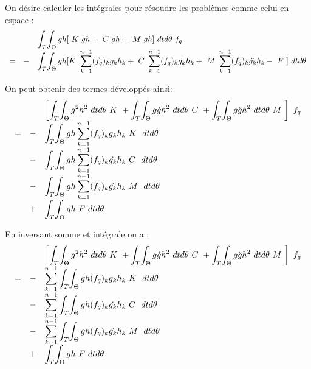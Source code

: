 On désire calculer les intégrales pour résoudre les problèmes comme celui en espace :
\begin{equation}
\begin{array}{r r l}
	&& \displaystyle
		\int_T \! \int_\Theta
			gh [  ~K~ gh
				+ ~C~ \dot{g}h 
				+ ~M~ \ddot{g}h
				] ~dt d\theta 
	~ f_q
	\\
	= &-& \displaystyle
		\int_T \! \int_\Theta		
			gh [  K~ \sum_{k=1}^{n-1} (f_q)_k       g_k  h_k 
				+ ~C~ \sum_{k=1}^{n-1} (f_q)_k  \dot{g_k} h_k 
				+ ~M~ \sum_{k=1}^{n-1} (f_q)_k \ddot{g_k} h_k
				- ~F~] ~dt d\theta
\end{array}
\end{equation}

On peut obtenir des termes développés ainsi:
\begin{equation}
\begin{array}{r r l}

	&&\left[\displaystyle
	\int_T \! \int_\Theta
		g^2h^2 ~dt d\theta ~K~
	+ \int_T \! \int_\Theta
		g \dot{g} h^2 ~dt d\theta ~C~ 
	+ \int_T \! \int_\Theta
		g \ddot{g} h^2 ~dt d\theta ~M~
			\right] ~ f_q
	\\
	= &-&
	 \displaystyle
	 \int_T \! \int_\Theta		
		gh \sum_{k=1}^{n-1} (f_q)_k       g_k  h_k ~K~ ~dt d\theta
	\\
	&-&
	 \displaystyle
	 \int_T \! \int_\Theta
	 	gh \sum_{k=1}^{n-1} (f_q)_k  \dot{g_k} h_k ~C~  ~dt d\theta
	\\
	&-&
	 \displaystyle
	 \int_T \! \int_\Theta
	 	gh \sum_{k=1}^{n-1} (f_q)_k \ddot{g_k} h_k ~M~ ~dt d\theta
	\\
	&+&
	 \displaystyle
	 \int_T \! \int_\Theta
	 	gh ~F ~dt d\theta 
\end{array}
\end{equation}

En inversant somme et intégrale on a :
\begin{equation}
\begin{array}{r r l}

	&&\left[\displaystyle
	\int_T \! \int_\Theta
		g^2h^2 ~dt d\theta ~K~
	+ \int_T \! \int_\Theta
		g \dot{g} h^2 ~dt d\theta ~C~ 
	+ \int_T \! \int_\Theta
		g \ddot{g} h^2 ~dt d\theta ~M~
			\right] ~ f_q
	\\
	= &-&
	 \displaystyle 
	 \sum_{k=1}^{n-1}
		 \int_T \! \int_\Theta		
			gh (f_q)_k       g_k  h_k ~K~ ~dt d\theta
	\\
	&-&
	 \displaystyle
	 \sum_{k=1}^{n-1}
		 \int_T \! \int_\Theta
		 	gh (f_q)_k  \dot{g_k} h_k ~C~  ~dt d\theta
	\\
	&-&
	 \displaystyle
	 \sum_{k=1}^{n-1}
		 \int_T \! \int_\Theta
		 	gh (f_q)_k \ddot{g_k} h_k ~M~ ~dt d\theta
	\\
	&+&
	 \displaystyle
	 \int_T \! \int_\Theta
	 	gh ~F ~dt d\theta 
\end{array}
\end{equation}

